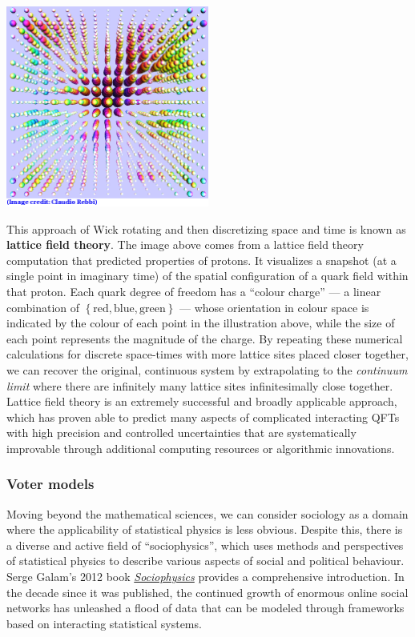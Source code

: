 \begin{center}\includegraphics[width=0.5\textwidth]{figs/unit10_lattice.pdf}\end{center}

This approach of Wick rotating and then discretizing space and time is known as \textbf{lattice field theory}.
The image above comes from a lattice field theory computation that predicted properties of protons.
It visualizes a snapshot (at a single point in imaginary time) of the spatial configuration of a quark field within that proton.
Each quark degree of freedom has a ``colour charge'' --- a linear combination of $\left\{\mbox{red}, \mbox{blue}, \mbox{green}\right\}$ --- whose orientation in colour space is indicated by the colour of each point in the illustration above, while the size of each point represents the magnitude of the charge.
By repeating these numerical calculations for discrete space-times with more lattice sites placed closer together, we can recover the original, continuous system by extrapolating to the  \textit{continuum limit} where there are infinitely many lattice sites infinitesimally close together.
Lattice field theory is an extremely successful and broadly applicable approach, which has proven able to predict many aspects of complicated interacting QFTs with high precision and controlled uncertainties that are systematically improvable through additional computing resources or algorithmic innovations.

\subsubsection*{Voter models}
Moving beyond the mathematical sciences, we can consider sociology as a domain where the applicability of statistical physics is less obvious.
Despite this, there is a diverse and active field of ``sociophysics'', which uses methods and perspectives of statistical physics to describe various aspects of social and political behaviour.
Serge Galam's 2012 book \href{https://liverpool.idm.oclc.org/login?url=http://dx.doi.org/10.1007/978-1-4614-2032-3}{\textit{Sociophysics}} provides a comprehensive introduction.
In the decade since it was published, the continued growth of enormous online social networks has unleashed a flood of data that can be modeled through frameworks based on interacting statistical systems.

